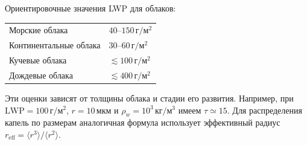 \documentclass[../final.tex]{subfiles}
\begin{document}
Ориентировочные значения LWP для облаков:
\begin{center}
\renewcommand{\arraystretch}{1.25}
\begin{tabular}{ll}
Морские облака&$40$--$150\,\text{г}/\text{м}^2$\\
Континентальные облака&$30$--$60\,\text{г}/\text{м}^2$\\
Кучевые облака&$\lesssim100\,\text{г}/\text{м}^2$\\
Дождевые облака&$\lesssim400\,\text{г}/\text{м}^2$
\end{tabular}
\end{center}
Эти оценки зависят от толщины облака и стадии его развития.
Например, при $\mathrm{LWP}=100\,\text{г}/\text{м}^2$,
$r=10\,\text{мкм}$ и $\rho_w=10^3\,\text{кг}/\text{м}^3$ имеем $\tau\simeq15$.
Для распределения капель по размерам аналогичная формула использует
эффективный радиус $r_{\mathrm{eff}}=\langle r^3\rangle/\langle r^2\rangle$.
\end{document}

